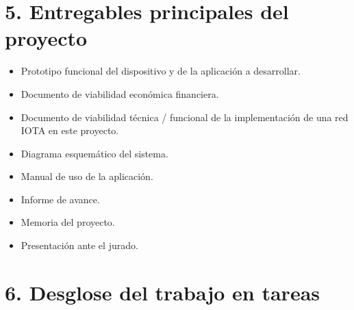 \documentclass[11pt]{charter}
\begin{document}
\section{5. Entregables principales del proyecto}
\label{sec:entregables}

\begin{itemize}
\item Prototipo funcional del dispositivo y de la aplicación a desarrollar.
\item Documento  de viabilidad económica financiera.
\item Documento de viabilidad técnica / funcional de la implementación de una red IOTA  en este proyecto.
\item Diagrama esquemático del sistema.
\item Manual de uso de la aplicación.
\item Informe de avance. 
\item Memoria del proyecto. 
\item Presentación ante el jurado.

\end{itemize}


\section{6. Desglose del trabajo en tareas}
\label{sec:wbs}
\end{document}
